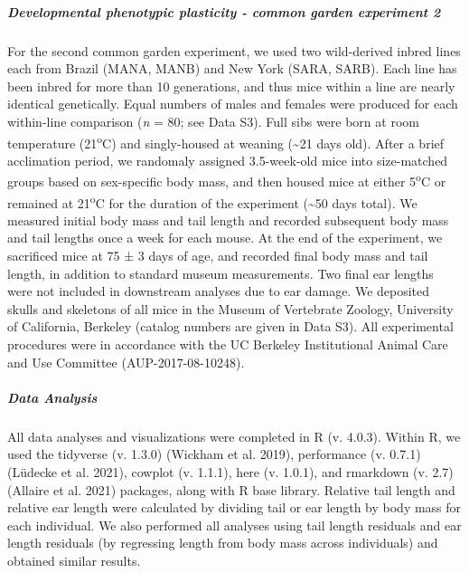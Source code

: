 \documentclass[]{article}
\let\oldsubparagraph\subparagraph
\renewcommand{\subparagraph}[1]{\oldsubparagraph{#1}\mbox{}}
\begin{document}
\vspace{2.5mm}

\hypertarget{developmental-phenotypic-plasticity---common-garden-experiment-2}{%
\subparagraph{\texorpdfstring{\emph{Developmental phenotypic plasticity
- common garden experiment
2}}{Developmental phenotypic plasticity - common garden experiment 2}}\label{developmental-phenotypic-plasticity---common-garden-experiment-2}}

For the second common garden experiment, we used two wild-derived inbred
lines each from Brazil (MANA, MANB) and New York (SARA, SARB). Each line
has been inbred for more than 10 generations, and thus mice within a
line are nearly identical genetically. Equal numbers of males and
females were produced for each within-line comparison (\emph{n} = 80;
see Data S3). Full sibs were born at room temperature
(21\textsuperscript{o}C) and singly-housed at weaning
(\textasciitilde{}21 days old). After a brief acclimation period, we
randomaly assigned 3.5-week-old mice into size-matched groups based on
sex-specific body mass, and then housed mice at either
5\textsuperscript{o}C or remained at 21\textsuperscript{o}C for the
duration of the experiment (\textasciitilde{}50 days total). We measured
initial body mass and tail length and recorded subsequent body mass and
tail lengths once a week for each mouse. At the end of the experiment,
we sacrificed mice at 75 ± 3 days of age, and recorded final body mass
and tail length, in addition to standard museum measurements. Two final
ear lengths were not included in downstream analyses due to ear damage.
We deposited skulls and skeletons of all mice in the Museum of
Vertebrate Zoology, University of California, Berkeley (catalog numbers
are given in Data S3). All experimental procedures were in accordance
with the UC Berkeley Institutional Animal Care and Use Committee
(AUP-2017-08-10248).

\vspace{2.5mm}

\hypertarget{data-analysis}{%
\subparagraph{\texorpdfstring{\emph{Data
Analysis}}{Data Analysis}}\label{data-analysis}}

All data analyses and visualizations were completed in R (v. 4.0.3).
Within R, we used the tidyverse (v. 1.3.0) (Wickham et al. 2019),
performance (v. 0.7.1) (Lüdecke et al. 2021), cowplot (v. 1.1.1), here
(v. 1.0.1), and rmarkdown (v. 2.7) (Allaire et al. 2021) packages, along
with R base library. Relative tail length and relative ear length were
calculated by dividing tail or ear length by body mass for each
individual. We also performed all analyses using tail length residuals
and ear length residuals (by regressing length from body mass across
individuals) and obtained similar results.
\end{document}

